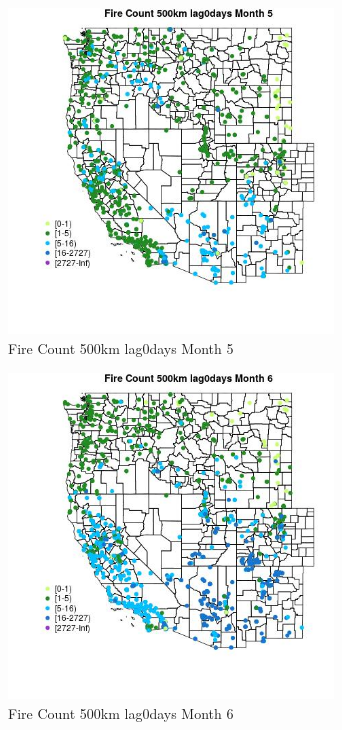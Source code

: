 \begin{figure} 
\centering  
\includegraphics[width=0.77\textwidth]{Code_Outputs/Report_ML_input_PM25_Step4_part_f_de_duplicated_aveswNAs_MapObsMo5Fire_Count_500km_lag0days.jpg} 
\caption{\label{fig:Report_ML_input_PM25_Step4_part_f_de_duplicated_aveswNAsMapObsMo5Fire_Count_500km_lag0days}Fire Count 500km lag0days Month 5} 
\end{figure} 
 

\begin{figure} 
\centering  
\includegraphics[width=0.77\textwidth]{Code_Outputs/Report_ML_input_PM25_Step4_part_f_de_duplicated_aveswNAs_MapObsMo6Fire_Count_500km_lag0days.jpg} 
\caption{\label{fig:Report_ML_input_PM25_Step4_part_f_de_duplicated_aveswNAsMapObsMo6Fire_Count_500km_lag0days}Fire Count 500km lag0days Month 6} 
\end{figure} 
 

